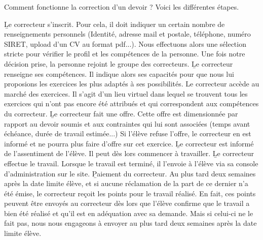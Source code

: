 ﻿Comment fonctionne la correction d'un devoir ? Voici les différentes étapes.

\begin{enumerate}
	\li \b{Le correcteur s'inscrit.} Pour cela, il doit indiquer un certain nombre de renseignements personnels  (Identité, adresse mail et postale, téléphone, numéro SIRET, upload d'un CV au format pdf...). Nous effectuons alors une sélection stricte pour vérifier le profil et les compétences de la personne. Une fois notre décision prise, la personne rejoint le groupe des correcteurs.
	\li\b{Le correcteur renseigne ses compétences.} Il indique alors ses capacités pour que nous lui proposions les exercices les plus adaptés à ses possibilités.
	\li \b{ Le correcteur accède au marché des exercices.} Il s'agit d'un lieu virtuel dans lequel se trouvent tous les exercices qui n'ont pas encore été attribués et qui correspondent aux compétences du correcteur.
	\li \b{Le correcteur fait une offre.}  Cette offre est dimensionnée par rapport au devoir soumis et aux contraintes qui lui sont associées (temps avant échéance, durée de travail estimée...) Si l'élève refuse l'offre, le correcteur en est informé et ne pourra plus faire d'offre sur cet exercice.
	\li \b{Le correcteur est informé de l'assentiment de l'élève.} Il peut dès lors commencer à travailler.
	\li \b{Le correcteur effectue le travail.} Lorsque le travail est terminé, il l'envoie à l'élève via sa console d'administration sur le site.
	\li \b{Paiement du correcteur.} Au plus tard deux semaines après la date limite élève, et si aucune réclamation de la part de ce dernier n'a été émise, le correcteur reçoit les points pour le travail réalisé. En fait, ces points peuvent être envoyés au correcteur dès lors que l'élève confirme que le travail a bien été réalisé et qu'il est en adéquation avec sa demande. Mais si celui-ci ne le fait pas, nous nous engageons à envoyer au plus tard deux semaines après la date limite élève.
\end{enumerate}